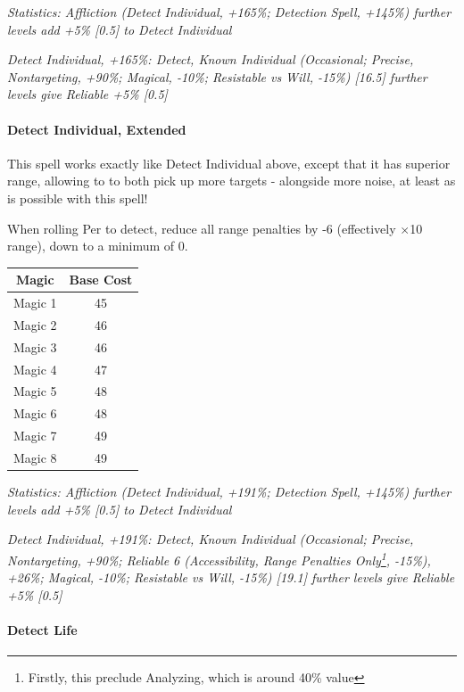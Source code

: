 \begin{multicols}{3}
	\textcolor{OliveGreen}{\textit{ Statistics: Affliction (Detect Individual, +165\%; Detection Spell, +145\%) further levels add +5\% [0.5] to Detect Individual}}
	
	\textcolor{OliveGreen}{\textit{Detect Individual, +165\%: Detect, Known Individual (Occasional; Precise, Nontargeting, +90\%; Magical, -10\%; Resistable vs Will, -15\%) [16.5] further levels give Reliable +5\% [0.5]}}
	
	\paragraph{Detect Individual, Extended}
	
	This spell works exactly like Detect Individual above, except that it has superior range, allowing to to both pick up more targets - alongside more noise, at least as is possible with this spell!
	
	When rolling Per to detect, reduce all range penalties by -6 (effectively $\times$10 range), down to a minimum of 0.
	
	\begin{center}
		\begin{tabular}{|c|c|}
			\hline
			Magic & Base Cost \\
			\hline
			\hline
			Magic 1 & 45 \\
			Magic 2 & 46 \\
			Magic 3 & 46 \\
			Magic 4 & 47 \\
			Magic 5 & 48 \\
			Magic 6 & 48 \\
			Magic 7 & 49 \\
			Magic 8 & 49 \\
			\hline
		\end{tabular}
	\end{center} 
	
	\textcolor{OliveGreen}{\textit{ Statistics: Affliction (Detect Individual, +191\%; Detection Spell, +145\%) further levels add +5\% [0.5] to Detect Individual}}
	
	\textcolor{OliveGreen}{\textit{Detect Individual, +191\%: Detect, Known Individual (Occasional; Precise, Nontargeting, +90\%; Reliable 6 (Accessibility, Range Penalties Only\footnote{Firstly, this preclude Analyzing, which is around 40\% value}, -15\%), +26\%; Magical, -10\%; Resistable vs Will, -15\%) [19.1] further levels give Reliable +5\% [0.5]}}
	
	\paragraph{Detect Life}
		

\end{multicols}
